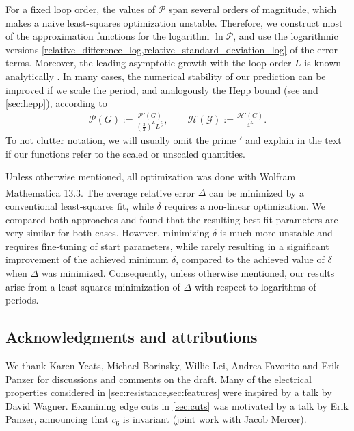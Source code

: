 \documentclass[11pt]{scrartcl}
\numberwithin{equation}{section}
\newcommand{\period}{\mathcal P}
\begin{document}
For a fixed loop order, the values of $\period$ span several orders of magnitude, which makes a naive least-squares optimization unstable. Therefore, we construct most of the approximation functions for the logarithm $\ln \period$, and use the logarithmic versions   \cref{relative_difference_log,relative_standard_deviation_log} of the error terms.
Moreover, the leading asymptotic growth with the loop order $L$ is known analytically \cite{mckane_nonperturbative_1984}. In many cases, the numerical stability of our prediction can be improved if we scale the period, and analogously the Hepp bound (see \cite{panzer_hepp_2022} and  \cref{sec:hepp}),   according to
\begin{align}\label{period_scaling}
	\period(G) := \frac{ \period'(G)}{\left( \frac 3 2  \right) ^L L^{\frac 5 2}}, \qquad  \mathcal{H(G)}:= \frac{\mathcal{H}'(G)}{4^L}.
\end{align}
To not clutter notation, we will usually omit the prime $'$ and explain in the text if our functions refer to the scaled or unscaled quantities.

Unless otherwise mentioned, all optimization was done with Wolfram  Mathematica\textsuperscript{\textregistered{}} 13.3. 
The average relative error $\Delta$ can be minimized by a conventional least-squares fit,  while $\delta$ requires a non-linear optimization. We  compared both approaches  and found that the resulting best-fit parameters are very similar for both cases. However, minimizing $\delta$ is much more unstable and requires fine-tuning of start parameters, while rarely resulting in a significant improvement of the achieved minimum $\delta$, compared to the achieved value of $\delta$ when $\Delta$ was minimized. Consequently, unless otherwise mentioned, our results arise from a least-squares minimization of $\Delta$ with respect to logarithms of periods.





\subsection{Acknowledgments and attributions}

We thank Karen Yeats, Michael Borinsky, Willie Lei, Andrea Favorito and Erik Panzer for discussions and comments on the draft.
Many of the electrical properties considered in \cref{sec:resistance,sec:features} were inspired  by a talk by David Wagner. Examining edge cuts in \cref{sec:cuts} was motivated by a talk by Erik Panzer, announcing that $c_6$ is invariant (joint work with Jacob Mercer).
\end{document}
